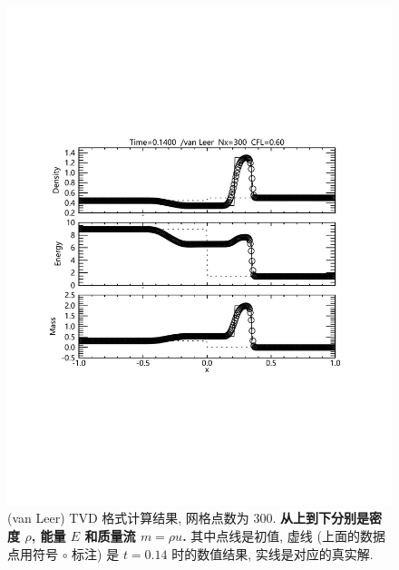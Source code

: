 \documentclass[10.5pt
]{article}
\begin{document}
\begin{figure}[htb]
\begin{center}
\includegraphics[width=.85\textwidth]{fig_tvd_1.pdf}
\caption{(van Leer) TVD 格式计算结果, 网格点数为 300. \textbf{从上到下分别是密度 $\rho$, 能量 $E$ 和质量流 $m = \rho u$.}
其中点线是初值, 虚线 (上面的数据点用符号 $\circ$ 标注) 是 $t=0.14$ 时的数值结果, 实线是对应的真实解. }\label{Fig:vanLeerA}
\end{center}
\end{figure}
\end{document}
